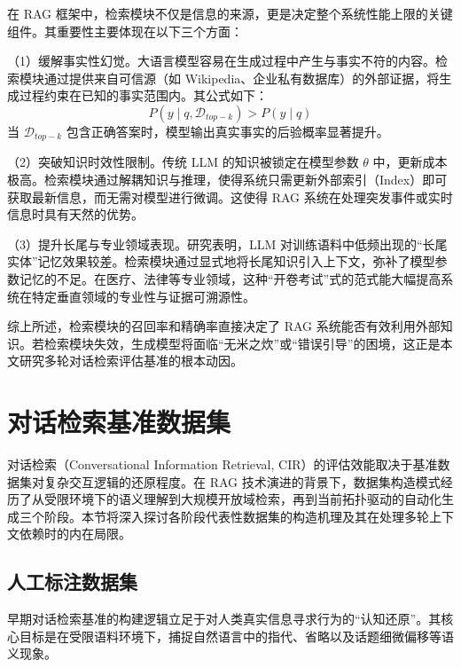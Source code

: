在 RAG 框架中，检索模块不仅是信息的来源，更是决定整个系统性能上限的关键组件。其重要性主要体现在以下三个方面：

（1）缓解事实性幻觉。大语言模型容易在生成过程中产生与事实不符的内容。检索模块通过提供来自可信源（如 Wikipedia、企业私有数据库）的外部证据，将生成过程约束在已知的事实范围内。其公式如下：
\begin{equation}
    P(y \mid q, \mathcal{D}_{top-k}) > P(y \mid q)
\end{equation}
当 $\mathcal{D}_{top-k}$ 包含正确答案时，模型输出真实事实的后验概率显著提升。

（2）突破知识时效性限制。传统 LLM 的知识被锁定在模型参数 $\theta$ 中，更新成本极高。检索模块通过解耦知识与推理，使得系统只需更新外部索引（Index）即可获取最新信息，而无需对模型进行微调。这使得 RAG 系统在处理突发事件或实时信息时具有天然的优势。

（3）提升长尾与专业领域表现。研究表明，LLM 对训练语料中低频出现的“长尾实体”记忆效果较差。检索模块通过显式地将长尾知识引入上下文，弥补了模型参数记忆的不足。在医疗、法律等专业领域，这种“开卷考试”式的范式能大幅提高系统在特定垂直领域的专业性与证据可溯源性。

综上所述，检索模块的召回率和精确率直接决定了 RAG 系统能否有效利用外部知识。若检索模块失效，生成模型将面临“无米之炊”或“错误引导”的困境，这正是本文研究多轮对话检索评估基准的根本动因。



\section{对话检索基准数据集}

对话检索（Conversational Information Retrieval, CIR）的评估效能取决于基准数据集对复杂交互逻辑的还原程度。在 RAG 技术演进的背景下，数据集构造模式经历了从受限环境下的语义理解到大规模开放域检索，再到当前拓扑驱动的自动化生成三个阶段。本节将深入探讨各阶段代表性数据集的构造机理及其在处理多轮上下文依赖时的内在局限。

\subsection{人工标注数据集}

早期对话检索基准的构建逻辑立足于对人类真实信息寻求行为的“认知还原”。其核心目标是在受限语料环境下，捕捉自然语言中的指代、省略以及话题细微偏移等语义现象。

